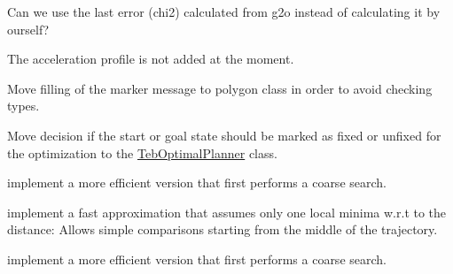 \begin{DoxyRefList}
Can we use the last error (chi2) calculated from g2o instead of calculating it by ourself?  
\item[全局 \mbox{\hyperlink{classteb__local__planner_1_1TebOptimalPlanner_a6853f051df0dfde21f1e6a2c4e15974c}{teb\+\_\+local\+\_\+planner\+::Teb\+Optimal\+Planner\+::get\+Full\+Trajectory}} (std\+::vector$<$ Trajectory\+Point\+Msg $>$ \&trajectory) const]\label{todo__todo000003}%
%
The acceleration profile is not added at the moment.  
\item[全局 \mbox{\hyperlink{classteb__local__planner_1_1TebVisualization_a4265504ad80d52ea050dc3c60f267bff}{teb\+\_\+local\+\_\+planner\+::Teb\+Visualization\+::publish\+Obstacles}} (const Obst\+Container \&obstacles) const]\label{todo__todo000013}%
%
Move filling of the marker message to polygon class in order to avoid checking types.  
\item[类 \mbox{\hyperlink{classteb__local__planner_1_1TimedElasticBand}{teb\+\_\+local\+\_\+planner\+::Timed\+Elastic\+Band}} ]\label{todo__todo000008}%
%
Move decision if the start or goal state should be marked as fixed or unfixed for the optimization to the \mbox{\hyperlink{classteb__local__planner_1_1TebOptimalPlanner}{Teb\+Optimal\+Planner}} class.  
\item[全局 \mbox{\hyperlink{classteb__local__planner_1_1TimedElasticBand_aaae3fcdccc1f539b16ef6d4a3cab0ae7}{teb\+\_\+local\+\_\+planner\+::Timed\+Elastic\+Band\+::find\+Closest\+Trajectory\+Pose}} (const Eigen\+::\+Ref$<$ const Eigen\+::\+Vector2d $>$ \&ref\+\_\+point, double $\ast$distance=NULL, int begin\+\_\+idx=0) const]\label{todo__todo000010}%
%
implement a more efficient version that first performs a coarse search. 

implement a fast approximation that assumes only one local minima w.\+r.\+t to the distance\+: Allows simple comparisons starting from the middle of the trajectory. 
\item[全局 \mbox{\hyperlink{classteb__local__planner_1_1TimedElasticBand_a21b422124633a6952e74fe14062929f1}{teb\+\_\+local\+\_\+planner\+::Timed\+Elastic\+Band\+::find\+Closest\+Trajectory\+Pose}} (const Eigen\+::\+Ref$<$ const Eigen\+::\+Vector2d $>$ \&ref\+\_\+line\+\_\+start, const Eigen\+::\+Ref$<$ const Eigen\+::\+Vector2d $>$ \&ref\+\_\+line\+\_\+end, double $\ast$distance=NULL) const]\label{todo__todo000011}%
%
implement a more efficient version that first performs a coarse search. 


\end{DoxyRefList}
